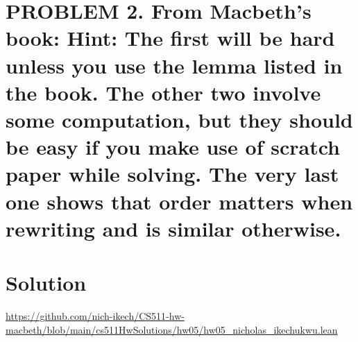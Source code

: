 \documentclass{article}
\begin{document}
\newpage

\section*{PROBLEM 2. From Macbeth’s book: Hint: The first will be hard unless you use the lemma listed in the book. The other two involve some
computation, but they should be easy if you make use of scratch paper while solving. The very last
one shows that order matters when rewriting and is similar otherwise.}
\section*{Solution}

\url{https://github.com/nich-ikech/CS511-hw-macbeth/blob/main/cs511HwSolutions/hw05/hw05_nicholas_ikechukwu.lean}
\end{document}

